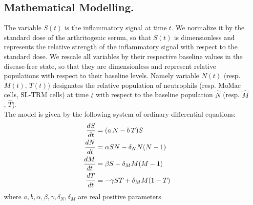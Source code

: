 \documentclass[a4paper, 12pt]{article}
\begin{document}
\subsection{Mathematical Modelling.}
The variable $S(t)$ is the inflammatory signal at time $t$. We normalize it by the standard dose of the arthritogenic serum, so that $S(t)$ is dimensionless and represents the relative strength of the inflammatory signal with respect to the standard dose.
We rescale all variables by their respective baseline values in the disease-free state, so that they are dimensionless and represent relative populations with respect to their baseline levels.
Namely variable $N(t)$ (resp. $M(t)$, $T(t)$) designates the relative population of neutrophils (resp. MoMac cells, SL-TRM cells) at time $t$ with respect to the baseline population $\widehat{N}$ (resp. $\widehat{M}$, $\widehat{T}$).\\
The model is given by the following system of ordinary differential equations:
\begin{subequations}\label{eq:system}
\renewcommand{\theequation}{\theparentequation.\arabic{equation}}
\begin{align}
\frac{dS}{dt} &= (a\, N - b\,T) S \label{eq:system:S}\\
\frac{dN}{dt} &= \alpha S N - \delta_N N (N-1) \label{eq:system:N}\\
\frac{dM}{dt} &= \beta S - \delta_M M (M-1) \label{eq:system:M}\\
\frac{dT}{dt} &= -\gamma S T + \delta_M M (1-T) \label{eq:system:T} 
\end{align}
\end{subequations}
where $a,b,\alpha,\beta,\gamma, \delta_N, \delta_M$ are real positive parameters.
\end{document}
